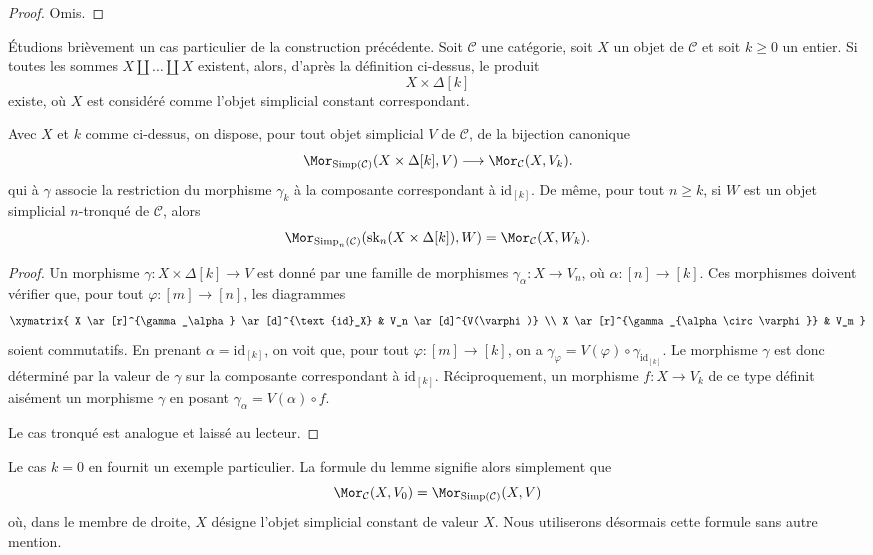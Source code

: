 \begin{proof}
Omis.
\end{proof}

\noindent
Étudions brièvement un cas particulier de la construction précédente.
Soit $\mathcal{C}$ une catégorie, soit $X$ un objet de $\mathcal{C}$ et
soit $k \geq 0$ un entier. Si toutes les sommes
$X \amalg \ldots \amalg X$ existent, alors, d'après la définition
ci-dessus, le produit
$$
X \times \Delta[k]
$$
existe, où $X$ est considéré comme l'objet simplicial constant
correspondant.

\begin{lemma}
\label{lemma-morphism-from-coproduct}
Avec $X$ et $k$ comme ci-dessus, on dispose, pour tout objet simplicial
$V$ de $\mathcal{C}$, de la bijection canonique
$$
\Mor_{\text{Simp}(\mathcal{C})}(X \times \Delta[k], V)
\longrightarrow
\Mor_\mathcal{C}(X, V_k).
$$
qui à $\gamma$ associe la restriction du morphisme $\gamma_k$ à la
composante correspondant à $\text{id}_{[k]}$. De même, pour tout
$n \geq k$, si $W$ est un objet simplicial $n$-tronqué de $\mathcal{C}$,
alors
$$
\Mor_{\text{Simp}_n(\mathcal{C})}(\text{sk}_n(X \times \Delta[k]), W)
=
\Mor_\mathcal{C}(X, W_k).
$$
\end{lemma}

\begin{proof}
Un morphisme $\gamma : X \times \Delta[k] \to V$ est donné par une
famille de morphismes $\gamma_\alpha : X \to V_n$, où
$\alpha : [n] \to [k]$. Ces morphismes doivent vérifier que, pour tout
$\varphi : [m] \to [n]$, les diagrammes
$$
\xymatrix{
X \ar[r]^{\gamma_\alpha} \ar[d]^{\text{id}_X} & V_n \ar[d]^{V(\varphi)} \\
X \ar[r]^{\gamma_{\alpha \circ \varphi}} & V_m
}
$$
soient commutatifs. En prenant $\alpha = \text{id}_{[k]}$, on voit que,
pour tout $\varphi : [m] \to [k]$, on a $\gamma_\varphi =
V(\varphi) \circ \gamma_{\text{id}_{[k]}}$. Le morphisme $\gamma$ est
donc déterminé par la valeur de $\gamma$ sur la composante correspondant à
$\text{id}_{[k]}$. Réciproquement, un morphisme $f : X \to V_k$ de ce
type définit aisément un morphisme $\gamma$ en posant
$\gamma_\alpha = V(\alpha) \circ f$.

\medskip\noindent
Le cas tronqué est analogue et laissé au lecteur.
\end{proof}

\noindent
Le cas $k = 0$ en fournit un exemple particulier. La formule du lemme
signifie alors simplement que
$$
\Mor_\mathcal{C}(X, V_0)
=
\Mor_{\text{Simp}(\mathcal{C})}(X, V)
$$
où, dans le membre de droite, $X$ désigne l'objet simplicial constant de
valeur $X$. Nous utiliserons désormais cette formule sans autre mention.




